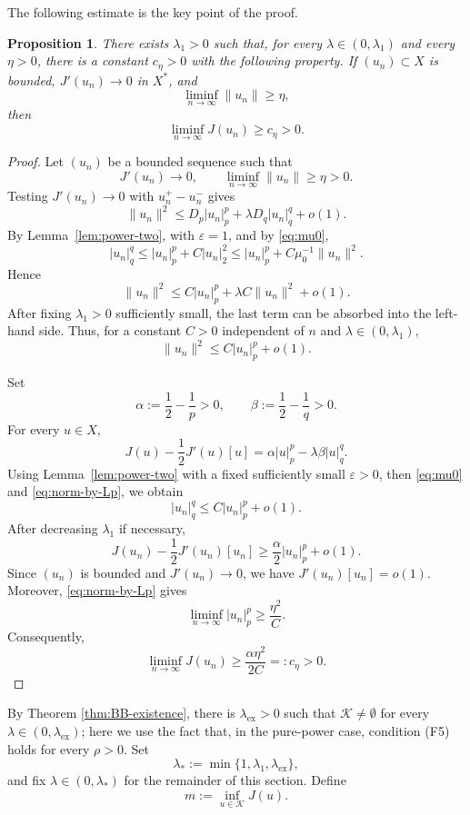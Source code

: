 \documentclass[11pt]{amsart}
\numberwithin{equation}{section}
\newtheorem{proposition}[theorem]{Proposition}
\theoremstyle{definition}
\newcommand{\cK}{\mathcal{K}}
\newcommand{\eps}{\varepsilon}
\begin{document}
The following estimate is the key point of the proof.

\begin{proposition}\label{prop:positive-ps}
There exists $\lambda_1>0$ such that, for every
$\lambda\in(0,\lambda_1)$ and every $\eta>0$, there is a constant
$c_\eta>0$ with the following property. If $(u_n)\subset X$ is bounded,
$J'(u_n)\to0$ in $X^*$, and
\[
\liminf_{n\to\infty}\|u_n\|\ge\eta,
\]
then
\[
\liminf_{n\to\infty}J(u_n)\ge c_\eta>0.
\]
\end{proposition}

\begin{proof}
Let $(u_n)$ be a bounded sequence such that
\[
J'(u_n)\to0,
\qquad
\liminf_{n\to\infty}\|u_n\|\ge\eta>0.
\]
Testing $J'(u_n)\to0$ with $u_n^+-u_n^-$ gives
\[
\|u_n\|^2
\le D_p|u_n|_p^p+\lambda D_q|u_n|_q^q+o(1).
\]
By Lemma~\ref{lem:power-two}, with $\eps=1$, and by \eqref{eq:mu0},
\[
|u_n|_q^q\le |u_n|_p^p+C|u_n|_2^2
\le |u_n|_p^p+C\mu_0^{-1}\|u_n\|^2.
\]
Hence
\[
\|u_n\|^2
\le C|u_n|_p^p+\lambda C\|u_n\|^2+o(1).
\]
After fixing $\lambda_1>0$ sufficiently small, the last term can be
absorbed into the left-hand side. Thus, for a constant $C>0$ independent of
$n$ and $\lambda\in(0,\lambda_1)$,
\begin{equation}\label{eq:norm-by-Lp}
\|u_n\|^2\le C|u_n|_p^p+o(1).
\end{equation}

Set
\[
\alpha:=\frac12-\frac1p>0,
\qquad
\beta:=\frac12-\frac1q>0.
\]
For every $u\in X$,
\[
J(u)-\frac12J'(u)[u]
=
\alpha |u|_p^p-\lambda\beta |u|_q^q.
\]
Using Lemma~\ref{lem:power-two} with a fixed sufficiently small $\eps>0$,
then \eqref{eq:mu0} and \eqref{eq:norm-by-Lp}, we obtain
\[
|u_n|_q^q\le C|u_n|_p^p+o(1).
\]
After decreasing $\lambda_1$ if necessary,
\[
J(u_n)-\frac12J'(u_n)[u_n]
\ge \frac{\alpha}{2}|u_n|_p^p+o(1).
\]
Since $(u_n)$ is bounded and $J'(u_n)\to0$, we have
$J'(u_n)[u_n]=o(1)$. Moreover, \eqref{eq:norm-by-Lp} gives
\[
\liminf_{n\to\infty}|u_n|_p^p\ge \frac{\eta^2}{C}.
\]
Consequently,
\[
\liminf_{n\to\infty}J(u_n)
\ge \frac{\alpha\eta^2}{2C}=:c_\eta>0.
\]
\end{proof}

By Theorem \ref{thm:BB-existence}, there is $\lambda_{\mathrm{ex}}>0$
such that $\cK\neq\emptyset$ for every
$\lambda\in(0,\lambda_{\mathrm{ex}})$; here we use the fact that, in
the pure-power case, condition (F5) holds for every $\rho>0$. Set
\[
\lambda_*:=\min\{1,\lambda_1,\lambda_{\mathrm{ex}}\},
\]
and fix $\lambda\in(0,\lambda_*)$ for the remainder of this section.
Define
\[
m:=\inf_{u\in\cK}J(u).
\]
\end{document}
